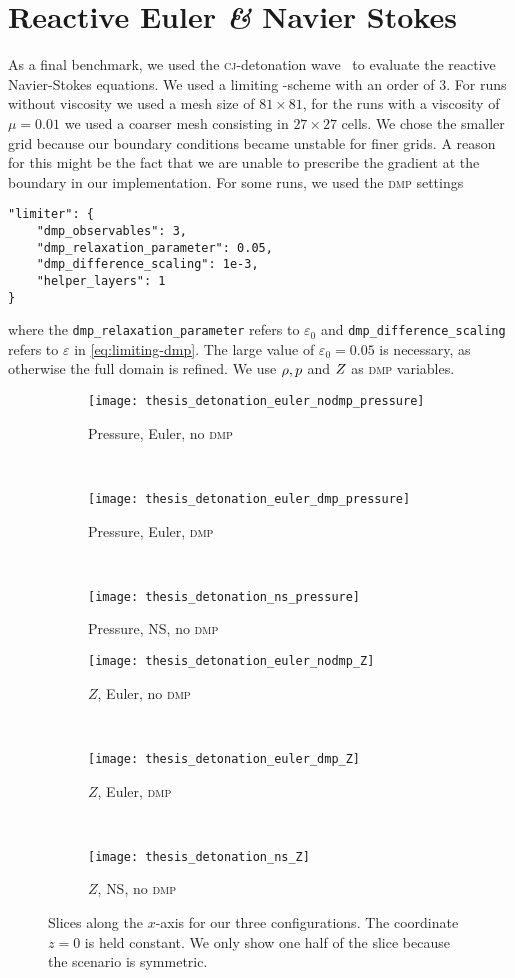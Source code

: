 \section{Reactive Euler \textit{\&} Navier Stokes}\label{sec:results-reactive}
As a final benchmark, we used the \textsc{cj}-detonation wave~ to evaluate the reactive Navier-Stokes equations.
We used a limiting \aderdg{}-scheme with an order of 3.
For runs without viscosity we used a mesh size of $81 \times 81$, for the runs with a viscosity of $\mu = 0.01$ we used a coarser mesh consisting in $27 \times 27$ cells.
We chose the smaller grid because our boundary conditions became unstable for finer grids.
A reason for this might be the fact that we are unable to prescribe the gradient at the boundary in our \muscl{} implementation.
For some runs, we used the \textsc{dmp} settings
\begin{verbatim}
"limiter": {
    "dmp_observables": 3,
    "dmp_relaxation_parameter": 0.05,
    "dmp_difference_scaling": 1e-3,
    "helper_layers": 1
}
\end{verbatim}
where the \texttt{dmp\_relaxation\_parameter} refers to $\varepsilon_0$ and \texttt{dmp\_difference\_scaling} refers to $\varepsilon$ in \cref{eq:limiting-dmp}.
The large value of $\varepsilon_0 = 0.05$ is necessary, as otherwise the full domain is refined.
We use $\rho, p$ and $Z$ as \textsc{dmp} variables.
\begin{figure}[tb]
  \centering
  \begin{subfigure}[t]{0.3\textwidth}
    \centering
    \texttt{[image: thesis\_detonation\_euler\_nodmp\_pressure]}
    \caption{Pressure, Euler, no \textsc{dmp}}
  \end{subfigure}~%
  \begin{subfigure}[t]{0.3\textwidth}
    \centering
    \texttt{[image: thesis\_detonation\_euler\_dmp\_pressure]}
    \caption{Pressure, Euler, \textsc{dmp}}
  \end{subfigure}~%
  \begin{subfigure}[t]{0.3\textwidth}
    \centering
    \texttt{[image: thesis\_detonation\_ns\_pressure]}
    \caption{Pressure, \textsc{NS}, no \textsc{dmp}}
  \end{subfigure}

  \begin{subfigure}[t]{0.3\textwidth}
    \centering
    \texttt{[image: thesis\_detonation\_euler\_nodmp\_Z]}
    \caption{$Z$, Euler, no \textsc{dmp}}
  \end{subfigure}~%
  \begin{subfigure}[t]{0.3\textwidth}
    \centering
    \texttt{[image: thesis\_detonation\_euler\_dmp\_Z]}
    \caption{$Z$, Euler, \textsc{dmp}}
  \end{subfigure}~%
  \begin{subfigure}[t]{0.3\textwidth}
    \centering
    \texttt{[image: thesis\_detonation\_ns\_Z]}
    \caption{$Z$, \textsc{NS}, no \textsc{dmp}}
  \end{subfigure}
  \caption{\label{fig:detonation-line-plots}%
    Slices along the $x$-axis for our three configurations.
    The coordinate $z = 0$ is held constant.
    We only show one half of the slice because the scenario is symmetric.
  }
\end{figure}
